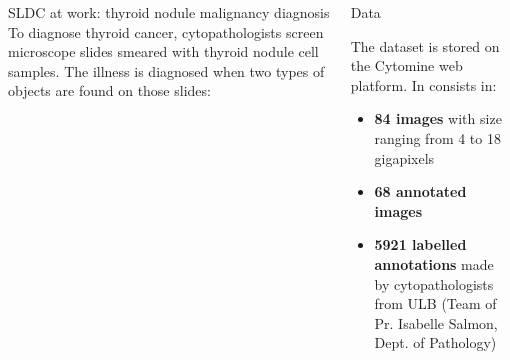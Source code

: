 \documentclass{beamer}
\begin{document}
\begin{frame}
\begin{columns}[t]
\begin{block}{SLDC at work: thyroid nodule malignancy diagnosis}
To diagnose thyroid cancer, cytopathologists screen microscope slides smeared with thyroid nodule cell samples. The illness is diagnosed when two types of objects are found on those slides: 

\begin{figure}
	\hspace{1cm}
\end{figure}
\end{block}

\begin{exampleblock}{Data}

The dataset is stored on the Cytomine \cite{maree2016collaborative} web platform. In consists in:

\begin{itemize}
	\item \textbf{84 images} with size ranging from 4 to 18 gigapixels
	\item \textbf{68 annotated images} 
	\item \textbf{5921 labelled annotations} made by cytopathologists from ULB (Team of Pr. Isabelle Salmon, Dept. of Pathology)
\end{itemize}


\end{exampleblock}
\end{columns}
\end{frame}
\end{document}

